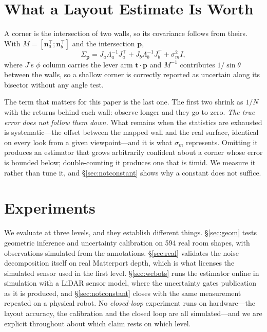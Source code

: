 \documentclass[conference,letterpaper,10pt]{IEEEtran}
\begin{document}
\section{What a Layout Estimate Is Worth}
\label{sec:unc}

A corner is the intersection of two walls, so its covariance follows from theirs. With
$M = [\mathbf{n}_a^\top; \mathbf{n}_b^\top]$ and the intersection $\mathbf{p}$,
\begin{equation}
\Sigma_{\mathbf{p}} = J_a \Lambda_a^{-1} J_a^\top + J_b \Lambda_b^{-1} J_b^\top + \sigma_m^2 I,
\label{eq:corner}
\end{equation}
where $J$'s $\phi$ column carries the lever arm $\mathbf{t}\cdot\mathbf{p}$ and $M^{-1}$ contributes
$1/\sin\theta$ between the walls, so a shallow corner is correctly reported as uncertain along its
bisector without any angle test.

The term that matters for this paper is the last one. The first two shrink as $1/N$ with the returns
behind each wall: observe longer and they go to zero. \emph{The true error does not follow them
down.} What remains when the statistics are exhausted is systematic---the offset between the mapped
wall and the real surface, identical on every look from a given viewpoint---and it is what
$\sigma_m$ represents. Omitting it produces an estimator that grows arbitrarily confident about a
corner whose error is bounded below; double-counting it produces one that is timid. We measure it
rather than tune it, and \S\ref{sec:notconstant} shows why a constant does not suffice.

\section{Experiments}
\label{sec:exp}

We evaluate at three levels, and they establish different things. \S\ref{sec:geom} tests geometric
inference and uncertainty calibration on \num{594} real room shapes, with observations simulated from
the annotations. \S\ref{sec:real} validates the noise decomposition itself on real Matterport depth,
which is what licenses the simulated sensor used in the first level. \S\ref{sec:webots} runs the estimator online in simulation with a LiDAR sensor model, where the
uncertainty gates publication as it is produced, and \S\ref{sec:notconstant} closes with the same
measurement repeated on a physical robot. No \emph{closed-loop} experiment runs on hardware---the
layout accuracy, the calibration and the closed loop are all simulated---and we are explicit
throughout about which claim rests on which level.
\end{document}
